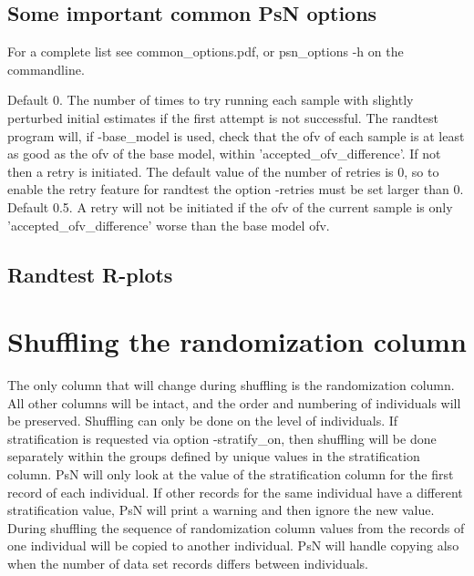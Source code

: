 \subsection{Some important common PsN options}
For a complete list see common\_options.pdf, 
or psn\_options -h on the commandline.

\begin{optionlist}
Default 0. The number of times to try running each sample with slightly perturbed initial estimates if the first attempt is not successful.
The randtest program will, if -base\_model is used, check that the ofv of each sample is at least as good as the ofv of
the base model, within 'accepted\_ofv\_difference'. If not then a retry is initiated. The default value of the number of
retries is 0, so to enable the retry feature for randtest the option -retries must be set larger than 0. 
\nextopt
{}
Default 0.5. A retry will not be initiated if the ofv of the current sample is only 'accepted\_ofv\_difference' worse than
the base model ofv.
\nextopt
\end{optionlist}


\subsection{Randtest R-plots}
\newcommand{\rplotsconditions}{
See section Output, subsections Basic and Extended plots,
for descriptions of the default randtest plots.
The default randtest template 
requires that option -base\_model was used, 
that input (full) model has more THETAs than base (reduced) model,
and that the additional THETAs are the ones relevant for the
randomization column.
For basic plots it is required that R libraries xpose4 and grid are installed.
Extended plots also require  
that R libraries
ggplot2, reshape2, gridExtra, scales, MASS and plotrix are installed.
If the conditions are not fulfilled then no pdf will be generated,
see the .Rout file in the main run directory for error messages.}



\section{Shuffling the randomization column}

The only column that will change during shuffling is the randomization column. All other columns will be intact, and the order and numbering of individuals will be preserved. Shuffling can only be done on the level of individuals. If stratification is requested via option -stratify\_on, then shuffling will be done separately within the groups defined by unique values in the stratification column. PsN will only look at the value of the stratification column for the first record of each individual. If other records for the same individual have a different stratification value, PsN will print a warning and then ignore the new value.
During shuffling the sequence of randomization column values from the records of one individual will be copied to another individual. PsN will handle copying also when the number of data set records differs between individuals.

